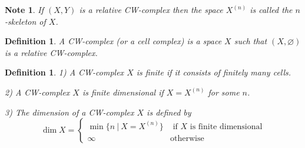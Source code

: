 \documentclass[11pt, letterpaper, oneside]{report}
\theoremstyle{pplain}
\theoremstyle{ddefinition}
\newtheorem{definition}[theorem]{Definition}
\newtheorem{note}[theorem]{Note}
\theoremstyle{nnn}
\theoremstyle{eexercise}
\begin{document}
\begin{note}
If $(X, Y)$ is a relative CW-complex then the space $X^{(n)}$ is called \emph{the $n$-skeleton}
of $X$. 
\end{note}

\begin{definition}
A \emph{CW-complex} (or a \emph{cell complex}) is a space $X$ such that $(X, \varnothing)$
is a relative CW-complex.  
\end{definition}

\begin{definition}
1) A CW-complex $X$ is \emph{finite} if it consists of finitely many cells. 

2) A CW-complex $X$ is \emph{finite dimensional} if $X= X^{(n)}$ for some $n$. 

3) The \emph{dimension} of a CW-complex $X$ is defined by 
$$
\dim X =
\begin{cases}
\min\{n \ | \  X = X^{(n)} \} & \text{ if $X$ is finite dimensional} \\
\infty  & \text{otherwise}
\end{cases}
$$
\end{definition}
\end{document}
